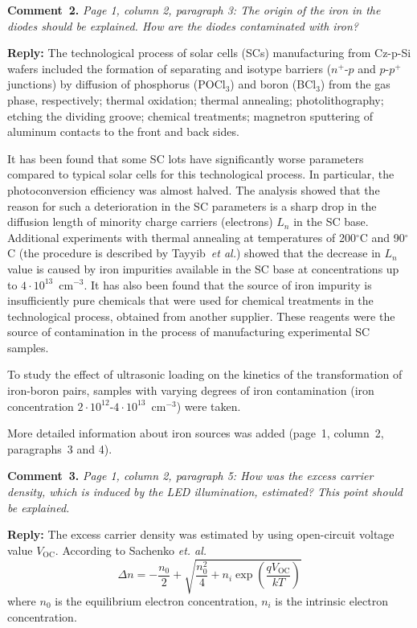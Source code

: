 \documentclass[sn-mathphys]{sn-jnl}
\begin{document}
\vspace{1cm}
\noindent
\textcolor[rgb]{0.00,0.50,1.00}{\textbf{Comment~2.}}
\emph{Page 1, column 2, paragraph 3: The origin of the iron in the diodes should be explained. How are the diodes contaminated with iron? }

\noindent
\textcolor[rgb]{0.51,0.00,0.00}{\textbf{Reply:}}
The technological process of solar cells (SCs) manufacturing from Cz-p-Si wafers included the formation of separating and isotype barriers ($n^+$-$p$ and $p$-$p^+$ junctions) by diffusion of phosphorus (POCl$_3$) and boron (BCl$_3$) from the gas phase, respectively; thermal oxidation; thermal annealing; photolithography; etching the dividing groove; chemical treatments; magnetron sputtering of aluminum contacts to the front and back sides.

It has been found that some SC lots have significantly worse parameters compared to typical solar cells for this technological process.
In particular, the photoconversion efficiency was almost halved.
The analysis showed that the reason for such a deterioration in the SC parameters is a sharp drop in the diffusion length of minority charge carriers (electrons) $L_n$ in the SC base.
Additional experiments with thermal annealing at temperatures of 200$^\circ$C and 90$^\circ$C
(the procedure is described by Tayyib~\emph{et al.}\cite{TAYYIB201221})
showed that the decrease in $L_n$ value is caused by iron impurities available in the SC base at concentrations up to $4\cdot10^{13}$~cm$^{-3}$.
It has also been found that the source of iron impurity is insufficiently pure chemicals that were used for chemical treatments in the technological process, obtained from another supplier.
These reagents were the source of contamination in the process of manufacturing experimental SC samples.

To study the effect of ultrasonic loading on the kinetics of the transformation  of iron-boron pairs, samples with varying degrees of iron contamination (iron concentration $2\cdot10^{12}$-$4\cdot10^{13}$~cm$^{-3}$) were taken.

More detailed information about iron sources was added (page~1, column~2, paragraphs~3 and 4).


\vspace{1cm}
\noindent
\textcolor[rgb]{0.00,0.50,1.00}{\textbf{Comment~3.}}
\emph{Page 1, column 2, paragraph 5: How was the excess carrier density, which is induced by the LED illumination, estimated? This point should be explained. }

\noindent
\textcolor[rgb]{0.51,0.00,0.00}{\textbf{Reply:}}
The excess carrier density was estimated by using open-circuit voltage value $V_\mathrm{OC}$.
According to Sachenko \emph{et. al.}\cite{JAPSach}
\begin{equation}
  \Delta n=-\frac{n_0}{2}+\sqrt{\frac{n_0^2}{4}+n_i\exp\left(\frac{qV_\mathrm{OC}}{kT}\right)}
\end{equation}
where
$n_0$ is the equilibrium electron concentration,
$n_i$ is the intrinsic electron concentration.
\end{document}

